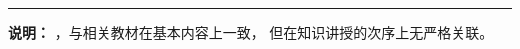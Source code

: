 








% 

\setcounter{tocdepth}{3}%
\tableofcontents

\let\itemize\compactitem 
\let\enditemize\endcompactitem 
\let\enumerate\compactenum 
\let\endenumerate\endcompactenum 
\let\description\compactdesc 
\let\enddescription\endcompactdesc
\setlength{\pltopsep}{0pt}

\bs\bs

\hrule

\bs\bs

{\bf 说明：} {，与相关教材在基本内容上一致，
但在知识讲授的次序上无严格关联。}%

\newpage

\setcounter{page}{1}

% 
% 



%

% 

% 

% 
% 
% 

% 
% 
% 
% 
% 
% 
% 
% 
% 
% 
% 
% 
% 

% 

% 
% 
% 
% 
% 
% 
% 
%
% 

% 

% 

% 
% 
% 
% 
% 
% 
% 
% 
% 
% 
% 

% 

% 

% 

